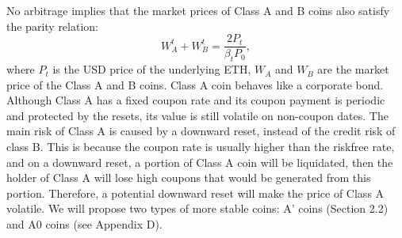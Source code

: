 \documentclass[draft, noinfoline]{ectaart}
\numberwithin{equation}{section}
\theoremstyle{plain}
\begin{document}
No arbitrage implies that the market prices of Class A and B coins also satisfy the parity relation:
$$W_A^t +W_B^t=\frac{2 P_t}{\beta_t P_0},$$
where $P_t$ is the USD price of the underlying ETH, $W_A$ and $W_B$ are the market price of the Class A and B coins. Class A coin behaves like a corporate bond. Although Class A has a fixed coupon rate and its coupon payment is periodic and protected by the resets, its value is still volatile on non-coupon dates. The main risk of Class A is caused by a downward reset, instead of the credit risk of class B. This is because the coupon rate is usually higher than the riskfree rate, and on a downward reset, a portion of Class A coin will be liquidated, then the holder of Class A will lose high coupons that would be generated from this portion. Therefore, a potential downward reset will make the price of Class A volatile. We will propose two types of more stable coins: A' coins (Section 2.2) and A0 coins (see Appendix D).
\end{document}
